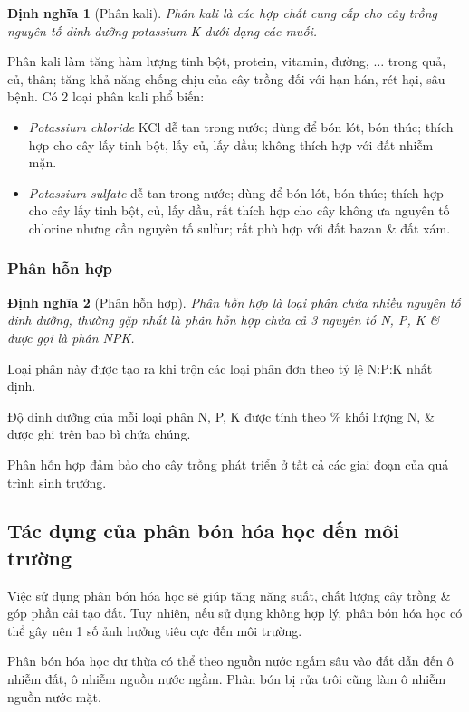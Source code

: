 \documentclass{article}
\newtheorem{dinhnghia}{Định nghĩa}
\begin{document}
\begin{dinhnghia}[Phân kali]
	{\rm Phân kali} là các hợp chất cung cấp cho cây trồng nguyên tố dinh dưỡng potassium {\rm K} dưới dạng các muối.
\end{dinhnghia}
Phân kali làm tăng hàm lượng tinh bột, protein, vitamin, đường, $\ldots$ trong quả, củ, thân; tăng khả năng chống chịu của cây trồng đối với hạn hán, rét hại, sâu bệnh. Có 2 loại phân kali phổ biến:
\begin{itemize}
	\item \textit{Potassium chloride} KCl dễ tan trong nước; dùng để bón lót, bón thúc; thích hợp cho cây lấy tinh bột, lấy củ, lấy dầu; không thích hợp với đất nhiễm mặn.
	\item \textit{Potassium sulfate}  dễ tan trong nước; dùng để bón lót, bón thúc; thích hợp cho cây lấy tinh bột, củ, lấy dầu, rất thích hợp cho cây không ưa nguyên tố chlorine nhưng cần nguyên tố sulfur; rất phù hợp với đất bazan \& đất xám.
\end{itemize}

\subsubsection{Phân hỗn hợp}

\begin{dinhnghia}[Phân hỗn hợp]
	{\rm Phân hỗn hợp} là loại phân chứa nhiều nguyên tố dinh dưỡng, thường gặp nhất là phân hỗn hợp chứa cả 3 nguyên tố {\rm N, P, K} \& được gọi là {\rm phân NPK}.
\end{dinhnghia}
Loại phân này được tạo ra khi trộn các loại phân đơn theo tỷ lệ N:P:K nhất định.

Độ dinh dưỡng của mỗi loại phân N, P, K được tính theo \% khối lượng N,  \& được ghi trên bao bì chứa chúng.

Phân hỗn hợp đảm bảo cho cây trồng phát triển ở tất cả các giai đoạn của quá trình sinh trưởng.

\subsection{Tác dụng của phân bón hóa học đến môi trường}
Việc sử dụng phân bón hóa học sẽ giúp tăng năng suất, chất lượng cây trồng \& góp phần cải tạo đất. Tuy nhiên, nếu sử dụng không hợp lý, phân bón hóa học có thể gây nên 1 số ảnh hưởng tiêu cực đến môi trường.

Phân bón hóa học dư thừa có thể theo nguồn nước ngấm sâu vào đất dẫn đến ô nhiễm đất, ô nhiễm nguồn nước ngầm. Phân bón bị rửa trôi cũng làm ô nhiễm nguồn nước mặt.
\end{document}
